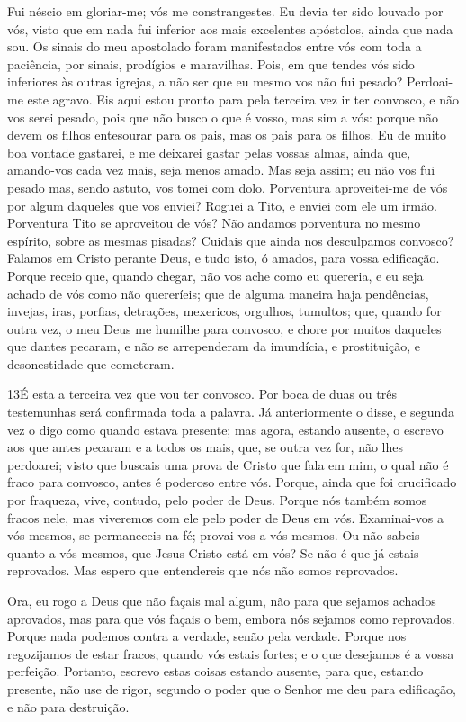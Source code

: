 Fui néscio em gloriar-me; vós me constrangestes. Eu devia ter
sido louvado por vós, visto que em nada fui inferior aos mais
excelentes apóstolos, ainda que nada sou. Os sinais do meu
apostolado foram manifestados entre vós com toda a paciência, por
sinais, prodígios e maravilhas. Pois, em que tendes vós sido
inferiores às outras igrejas, a não ser que eu mesmo vos não fui
pesado? Perdoai-me este agravo. Eis aqui estou pronto para
pela terceira vez ir ter convosco, e não vos serei pesado, pois que
não busco o que é vosso, mas sim a vós: porque não devem os filhos
entesourar para os pais, mas os pais para os filhos. Eu de
muito boa vontade gastarei, e me deixarei gastar pelas vossas almas,
ainda que, amando-vos cada vez mais, seja menos amado. Mas
seja assim; eu não vos fui pesado mas, sendo astuto, vos tomei com
dolo. Porventura aproveitei-me de vós por algum daqueles que
vos enviei? Roguei a Tito, e enviei com ele um irmão.
Porventura Tito se aproveitou de vós? Não andamos porventura no
mesmo espírito, sobre as mesmas pisadas? Cuidais que ainda
nos desculpamos convosco? Falamos em Cristo perante Deus, e tudo
isto, ó amados, para vossa edificação. Porque receio que,
quando chegar, não vos ache como eu quereria, e eu seja achado de
vós como não quereríeis; que de alguma maneira haja pendências,
invejas, iras, porfias, detrações, mexericos, orgulhos, tumultos;
que, quando for outra vez, o meu Deus me humilhe para
convosco, e chore por muitos daqueles que dantes pecaram, e não se
arrependeram da imundícia, e prostituição, e desonestidade que
cometeram.

\medskip

\lettrine{13} É esta a terceira vez que vou ter convosco. Por
boca de duas ou três testemunhas será confirmada toda a palavra.
Já anteriormente o disse, e segunda vez o digo como quando
estava presente; mas agora, estando ausente, o escrevo aos que antes
pecaram e a todos os mais, que, se outra vez for, não lhes
perdoarei; visto que buscais uma prova de Cristo que fala em
mim, o qual não é fraco para convosco, antes é poderoso entre vós.
Porque, ainda que foi crucificado por fraqueza, vive, contudo,
pelo poder de Deus. Porque nós também somos fracos nele, mas
viveremos com ele pelo poder de Deus em vós. Examinai-vos a vós
mesmos, se permaneceis na fé; provai-vos a vós mesmos. Ou não sabeis
quanto a vós mesmos, que Jesus Cristo está em vós? Se não é que já
estais reprovados. Mas espero que entendereis que nós não somos
reprovados.

Ora, eu rogo a Deus que não façais mal algum, não para que sejamos
achados aprovados, mas para que vós façais o bem, embora nós sejamos
como reprovados. Porque nada podemos contra a verdade, senão
pela verdade. Porque nos regozijamos de estar fracos, quando vós
estais fortes; e o que desejamos é a vossa perfeição.
Portanto, escrevo estas coisas estando ausente, para que,
estando presente, não use de rigor, segundo o poder que o Senhor me
deu para edificação, e não para destruição.

